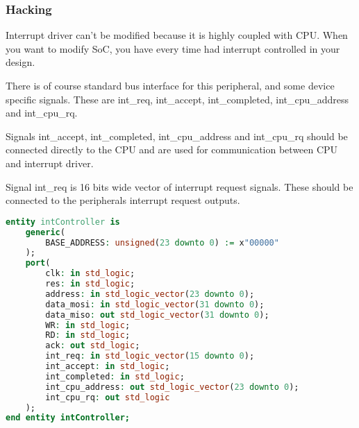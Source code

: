\subsubsection{Hacking}

Interrupt driver can't be modified because it is highly coupled with CPU. When
you want to modify SoC, you have every time had interrupt controlled in your design.

There is of course standard bus interface for this peripheral, and some device
specific signals. These are int\_req, int\_accept, int\_completed,
int\_cpu\_address and int\_cpu\_rq.

Signals int\_accept, int\_completed, int\_cpu\_address and int\_cpu\_rq should
be connected directly to the CPU and are used for communication between CPU and
interrupt driver.

Signal int\_req is 16 bits wide vector of interrupt request signals. These should be
connected to the peripherals interrupt request outputs.

\begin{lstlisting}[language=VHDL, frame=single]
entity intController is
    generic(
        BASE_ADDRESS: unsigned(23 downto 0) := x"00000"
    );
    port(
        clk: in std_logic;
        res: in std_logic;
        address: in std_logic_vector(23 downto 0);
        data_mosi: in std_logic_vector(31 downto 0);
        data_miso: out std_logic_vector(31 downto 0);
        WR: in std_logic;
        RD: in std_logic;
        ack: out std_logic;
        int_req: in std_logic_vector(15 downto 0);
        int_accept: in std_logic;
        int_completed: in std_logic;
        int_cpu_address: out std_logic_vector(23 downto 0);
        int_cpu_rq: out std_logic
    );
end entity intController;
\end{lstlisting}

